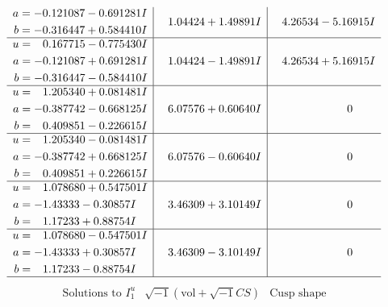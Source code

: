 \documentclass[1p]{elsarticle_modified}
\theoremstyle{definition}
\newcommand{\I}{\sqrt{-1}}
\begin{document}
$$\begin{array}{c|c|c}
\begin{aligned}
a &= -0.121087 - 0.691281 I \\
b &= -0.316447 + 0.584410 I\end{aligned}
 & \phantom{-}1.04424 + 1.49891 I & \phantom{-}4.26534 - 5.16915 I \\ \hline\begin{aligned}
u &= \phantom{-}0.167715 - 0.775430 I \\
a &= -0.121087 + 0.691281 I \\
b &= -0.316447 - 0.584410 I\end{aligned}
 & \phantom{-}1.04424 - 1.49891 I & \phantom{-}4.26534 + 5.16915 I \\ \hline\begin{aligned}
u &= \phantom{-}1.205340 + 0.081481 I \\
a &= -0.387742 - 0.668125 I \\
b &= \phantom{-}0.409851 - 0.226615 I\end{aligned}
 & \phantom{-}6.07576 + 0.60640 I & \phantom{-0.000000 } 0 \\ \hline\begin{aligned}
u &= \phantom{-}1.205340 - 0.081481 I \\
a &= -0.387742 + 0.668125 I \\
b &= \phantom{-}0.409851 + 0.226615 I\end{aligned}
 & \phantom{-}6.07576 - 0.60640 I & \phantom{-0.000000 } 0 \\ \hline\begin{aligned}
u &= \phantom{-}1.078680 + 0.547501 I \\
a &= -1.43333 - 0.30857 I \\
b &= \phantom{-}1.17233 + 0.88754 I\end{aligned}
 & \phantom{-}3.46309 + 3.10149 I & \phantom{-0.000000 } 0 \\ \hline\begin{aligned}
u &= \phantom{-}1.078680 - 0.547501 I \\
a &= -1.43333 + 0.30857 I \\
b &= \phantom{-}1.17233 - 0.88754 I\end{aligned}
 & \phantom{-}3.46309 - 3.10149 I & \phantom{-0.000000 } 0\\
 \hline 
 \end{array}$$\newpage$$\begin{array}{c|c|c}  
\text{Solutions to }I^u_{1}& \I (\text{vol} + \sqrt{-1}CS) & \text{Cusp shape}\\
 \hline 
\begin{aligned}

\end{aligned}
\end{array}$$
\end{document}
